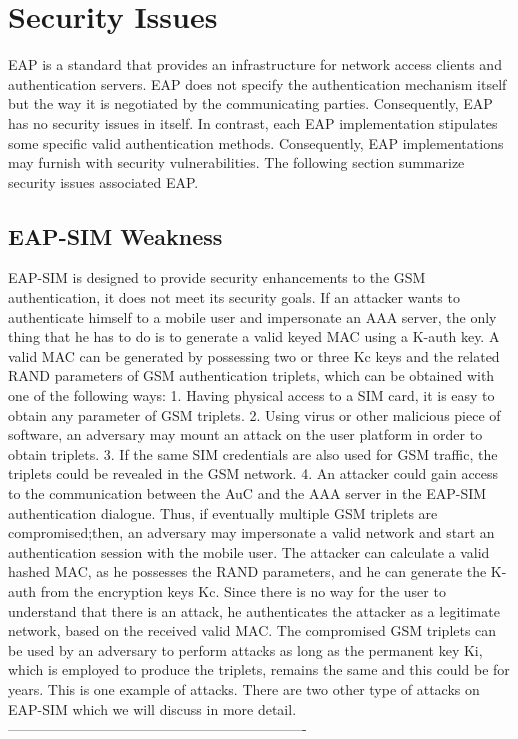 \chapter{Security Issues}

EAP is a standard that provides an infrastructure for network access clients and authentication servers. EAP does not specify the authentication mechanism itself but the way it is negotiated by the communicating parties. Consequently, EAP has no security issues in itself. In contrast, each EAP implementation stipulates some specific valid authentication methods. Consequently, EAP implementations may furnish with security vulnerabilities. The following section summarize security issues associated EAP.

\section{EAP-SIM Weakness}
EAP-SIM is designed to provide security enhancements to the GSM authentication, it does not meet its
security goals. If an attacker wants to authenticate himself to a mobile user and impersonate an AAA server, the only thing that he has to do is to generate a valid keyed MAC using a K-auth key. A valid MAC can be generated by possessing two or three Kc keys and the related RAND parameters of GSM authentication triplets, which can be obtained with one of the following ways:
1. Having physical access to a SIM card, it is easy to obtain any parameter of GSM triplets.
2. Using virus or other malicious piece of software, an adversary may mount an attack on the user platform in
order to obtain triplets.  
3. If the same SIM credentials are also used for GSM traffic, the triplets could be revealed in the GSM network.
4. An attacker could gain access to the communication between the AuC and the AAA server in the EAP-SIM
authentication dialogue.
Thus, if eventually multiple GSM triplets are compromised;then, an adversary may impersonate a valid network and start an authentication session with the mobile user. The attacker can calculate a valid hashed MAC, as he possesses the RAND parameters, and he can generate the K-auth from the encryption keys Kc. Since there is no way for the user to understand that there is an attack, he authenticates the attacker as a legitimate network, based on the received valid MAC.
The compromised GSM triplets can be used by an adversary to perform attacks as long as the permanent key Ki, which is employed to produce the triplets, remains the same and this could be for years. This is one example of attacks. 
There are two other type of attacks on EAP-SIM which we will discuss in more detail. 
----------------------------------------------------------------
